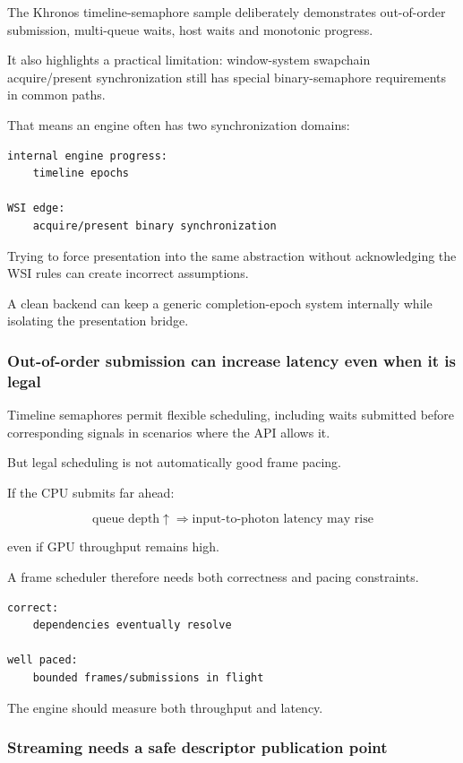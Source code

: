 The Khronos timeline-semaphore sample deliberately demonstrates out-of-order submission, multi-queue waits, host waits and monotonic progress.

It also highlights a practical limitation: window-system swapchain acquire/present synchronization still has special binary-semaphore requirements in common paths.

That means an engine often has two synchronization domains:

\begin{verbatim}
internal engine progress:
    timeline epochs

WSI edge:
    acquire/present binary synchronization
\end{verbatim}

Trying to force presentation into the same abstraction without acknowledging the WSI rules can create incorrect assumptions.

A clean backend can keep a generic completion-epoch system internally while isolating the presentation bridge.

\subsubsection{Out-of-order submission can increase latency even when it is legal}\label{05-engine-i-ch023-out-of-order-submission-can-increase-latency-even-when-it-is-legal}

Timeline semaphores permit flexible scheduling, including waits submitted before corresponding signals in scenarios where the API allows it.

But legal scheduling is not automatically good frame pacing.

If the CPU submits far ahead:

\[
\text{queue depth}\uparrow
\Rightarrow
\text{input-to-photon latency may rise}
\]

even if GPU throughput remains high.

A frame scheduler therefore needs both correctness and pacing constraints.

\begin{verbatim}
correct:
    dependencies eventually resolve

well paced:
    bounded frames/submissions in flight
\end{verbatim}

The engine should measure both throughput and latency.

\subsubsection{Streaming needs a safe descriptor publication point}\label{05-engine-i-ch023-streaming-needs-a-safe-descriptor-publication-point}

